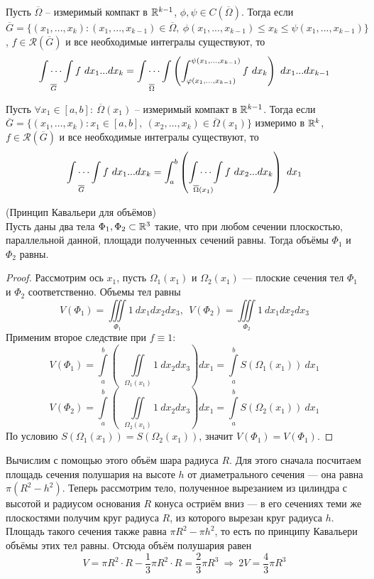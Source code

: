 \begin{consequense}
    Пусть $\overline{\Omega}$ -- измеримый компакт в $\R^{k-1}$, $\phi, \psi \in C(\overline{\Omega})$. Тогда если
    $\overline{G} = \{(x_1,...,x_k) : (x_1,...,x_{k-1}) \in \overline{\Omega}, \ \phi(x_1,...,x_{k-1})\leqslant x_k \leqslant \psi(x_1,...,x_{k-1})\}$, $f \in \mathcal{R}(\overline{G})$ и все необходимые интегралы существуют, то
    \[\idotsint\limits_{\overline{G}}f \ dx_1...dx_k = \idotsint\limits_{\overline{\Omega}}\left(\int_{\phi(x_1,...,x_{k-1})}^{\psi(x_1,...,x_{k-1})}f \ dx_k\right)\ dx_1...dx_{k-1}\]
\end{consequense}
\begin{consequense}
    Пусть $\forall x_1 \in [a, b]: \ \overline{\Omega}(x_1)$ -- измеримый компакт в $\R^{k-1}$. Тогда если
    $\overline{G} = \{(x_1,...,x_k) : x_1 \in [a, b], \ (x_2,...,x_{k}) \in \overline{\Omega}(x_1)\}$ измеримо в $\R^k$, $f \in \mathcal{R}(\overline{G})$ и все необходимые интегралы существуют, то
    \[\idotsint\limits_{\overline{G}}f \ dx_1...dx_k = \int_{a}^{b}\left(\idotsint\limits_{\overline{\Omega}(x_1)}f \ dx_2...dx_k\right)\ dx_1\]
\end{consequense}
\begin{consequense}(Принцип Кавальери для объёмов)\\
    Пусть даны два тела $\Phi_1, \Phi_2 \subset \R^3$ такие, что при любом сечении плоскостью, параллельной данной, площади полученных сечений равны. Тогда объёмы $\Phi_1$ и $\Phi_2$ равны.
\end{consequense}
\begin{proof}
    Рассмотрим ось $x_1$, пусть $\Omega_1(x_1)$ и $\Omega_2(x_1)$ --- плоские сечения тел $\Phi_1$ и $\Phi_2$ соответственно. Объемы тел равны
    \[V(\Phi_1)=\iiint\limits_{\Phi_1}1\ dx_1 dx_2 dx_3, \ \ V(\Phi_2)=\iiint\limits_{\Phi_2}1\ dx_1 dx_2 dx_3\]
    Применим второе следствие при $f\equiv 1$:
    \[V(\Phi_1)=\int\limits_{a}^{b}\left(\ \ \iint\limits_{\Omega_1(x_1)}1\ dx_2 dx_3\right)dx_1=\int\limits_{a}^{b}S(\Omega_1(x_1))\ dx_1\]
    \[V(\Phi_2)=\int\limits_{a}^{b}\left(\ \ \iint\limits_{\Omega_2(x_1)}1\ dx_2 dx_3\right)dx_1=\int\limits_{a}^{b}S(\Omega_2(x_1))\ dx_1\]
    По условию $S(\Omega_1(x_1))=S(\Omega_2(x_1))$, значит $V(\Phi_1)=V(\Phi_1)$.
\end{proof}
\begin{example}
    Вычислим с помощью этого объём шара радиуса $R$. Для этого сначала посчитаем площадь сечения полушария на высоте $h$ от диаметрального сечения --- она равна $\pi(R^2 - h^2)$. Теперь рассмотрим тело, полученное вырезанием из цилиндра с высотой и радиусом основания $R$ конуса остриём вниз --- в его сечениях теми же плоскостями получим круг радиуса $R$, из которого вырезан круг радиуса $h$. Площадь такого сечения также равна $\pi R^2 - \pi h^2$, то есть по принципу Кавальери объёмы этих тел равны. Отсюда объём полушария равен
    \[V = \pi R^2 \cdot R - \frac{1}{3}\pi R^2 \cdot R = \frac{2}{3}\pi R^3\ \Rightarrow\ 2V = \frac{4}{3}\pi R^3\]
\end{example}
\newpage